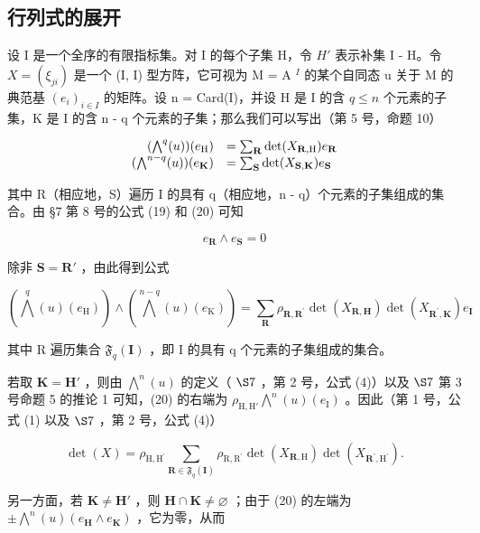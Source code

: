 \subsection{行列式的展开}

设 I 是一个全序的有限指标集。对 I 的每个子集 H，令 \(H'\) 表示补集 I - H。令 \(X = (\xi_{ji})\) 是一个 (I, I) 型方阵，它可视为 M = A \(^{I}\) 的某个自同态 u 关于 M 的典范基 \((e_{i})_{i \in I}\) 的矩阵。设 n = Card(I)，并设 H 是 I 的含 \(q \leqslant n\) 个元素的子集，K 是 I 的含 n - q 个元素的子集；那么我们可以写出（第 5 号，命题 10）

\[
\begin{array}{r l} (\bigwedge^ {q} (u)) (e _ {\mathrm{H}}) & = \sum_ {\mathbf {R}} \det (X _ {\mathbf {R}, \mathrm{H}}) e _ {\mathbf {R}} \\ (\bigwedge^ {n - q} (u)) (e _ {\mathbf {K}}) & = \sum_ {\mathbf {S}} \det (X _ {\mathbf {S}, \mathbf {K}}) e _ {\mathbf {S}} \end{array}
\]

其中 R（相应地，S）遍历 I 的具有 q（相应地，n - q）个元素的子集组成的集合。由 §7 第 8 号的公式 (19) 和 (20) 可知

\[
e _ {\mathbf {R}} \wedge e _ {\mathbf {S}} = 0
\]

除非 \(\mathbf{S} = \mathbf{R}'\) ，由此得到公式

\[
\left(\bigwedge^ {q} (u) \left(e _ {\mathrm{H}}\right)\right) \wedge \left(\bigwedge^ {n - q} (u) \left(e _ {\mathrm{K}}\right)\right) = \sum_ {\mathbf {R}} \rho_ {\mathbf {R}, \mathbf {R} ^ {\prime}} \det \left(X _ {\mathbf {R}, \mathbf {H}}\right) \det \left(X _ {\mathbf {R} ^ {\prime}, \mathbf {K}}\right) e _ {\mathbf {I}}\tag{20}
\]

其中 R 遍历集合 \(\mathfrak{F}_{q}(\mathbf{I})\) ，即 I 的具有 q 个元素的子集组成的集合。

若取 \(\mathbf{K} = \mathbf{H}'\) ，则由 \(\bigwedge^{n}(u)\) 的定义（ \(\S 7\) ，第 2 号，公式 (4)）以及 \(\S 7\) 第 3 号命题 5 的推论 1 可知，(20) 的右端为 \(\rho_{\mathrm{H},\mathrm{H}'}\bigwedge^{n}(u)(e_{\mathrm{I}})\) 。因此（第 1 号，公式 (1) 以及 \(\S 7\) ，第 2 号，公式 (4)）

\[
\det (X) = \rho_ {\mathrm{H}, \mathrm{H} ^ {\prime}} \sum_ {\mathbf {R} \in \mathfrak {F} _ {q} (\mathbf {I})} \rho_ {\mathrm{R}, \mathrm{R} ^ {\prime}} \det (X _ {\mathbf {R}, \mathrm{H}}) \det (X _ {\mathbf {R} ^ {\prime}, \mathrm{H} ^ {\prime}}).\tag{21}
\]

另一方面，若 \(\mathbf{K} \neq \mathbf{H}'\) ，则 \(\mathbf{H} \cap \mathbf{K} \neq \varnothing\) ；由于 (20) 的左端为 \(\pm \bigwedge^{n}(u)(e_{\mathbf{H}} \wedge e_{\mathbf{K}})\) ，它为零，从而

